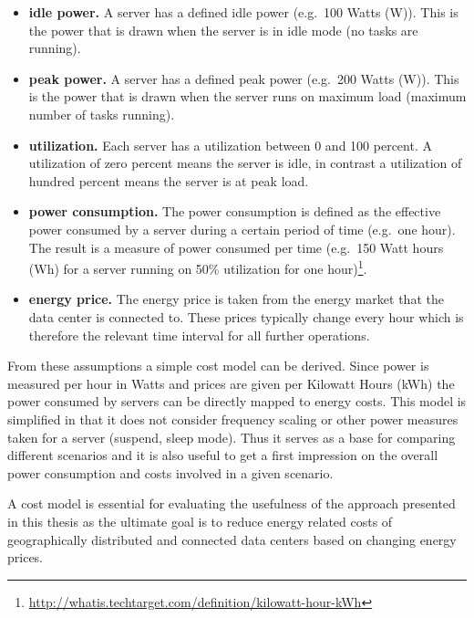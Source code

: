 \begin{itemize}

\item \textbf{idle power.} A server has a defined idle power (e.g.~100 Watts (W)). This is the power that is drawn when the server is in idle mode (no tasks are running). 

\item \textbf{peak power.} A server has a defined peak power (e.g.~200 Watts (W)). This is the power that is drawn when the server runs on maximum load (maximum number of tasks running). 

\item \textbf{utilization.} Each server has a utilization between 0 and 100 percent. A utilization of zero percent means the server is idle, in contrast a utilization of hundred percent means the server is at peak load. 

\item \textbf{power consumption.} The power consumption is defined as the effective power consumed by a server during a certain period of time (e.g.~one hour). The result is a measure of power consumed per time (e.g.~150 Watt hours (Wh) for a server running on 50\% utilization for one hour)\footnote{\url{http://whatis.techtarget.com/definition/kilowatt-hour-kWh}}. %

\item \textbf{energy price.} The energy price is taken from the energy market that the data center is connected to. These prices typically change every hour which is therefore the relevant time interval for all further operations. 

\end{itemize}

From these assumptions a simple cost model can be derived. Since power is measured per hour in Watts and prices are given per Kilowatt Hours (kWh) the power consumed by servers can be directly mapped to energy costs. This model is simplified in that it does not consider frequency scaling or other power measures taken for a server (suspend, sleep mode). Thus it serves as a base for comparing different scenarios and it is also useful to get a first impression on the overall power consumption and costs involved in a given scenario. 

A cost model is essential for evaluating the usefulness of the approach presented in this thesis as the ultimate goal is to reduce energy related costs of geographically distributed and connected data centers based on changing energy prices. 





